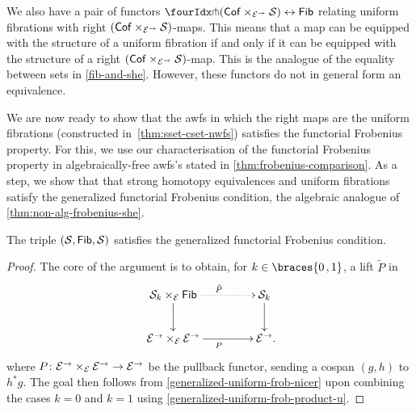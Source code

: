 \documentclass[reqno,10pt,a4paper,oneside,draft]{amsart}
\begin{document}
{{\begin{remark} \label{relating-strong-hequiv-and-uniform-fib}
We also have a pair of functors $\liftr{(\Cof \times_{\cal{E}^\to} \cal{S})} \leftrightarrow \Fib$ relating uniform fibrations with right $(\mathsf{Cof} \times_{\mathcal{E}^\to} \mathcal{S})$-maps.
This means that a map can be equipped with the structure of a uniform fibration if and only if it can be equipped with the structure of a right $(\mathsf{Cof} \times_{\mathcal{E}^\to} \mathcal{S})$-map.
This is the analogue of the equality between sets in \cref{fib-and-she}.
However, these functors do not in general form an equivalence.
\end{remark}

We are now ready to show that the awfs in which the right maps are the uniform fibrations (constructed in~\cref{thm:sset-cset-nwfs}) satisfies the functorial Frobenius property.
For this, we use our characterisation of the functorial Frobenius property in algebraically-free awfs's stated in \cref{thm:frobenius-comparison}.
As a step, we show that that strong homotopy equivalences and uniform fibrations satisfy the generalized functorial Frobenius condition, \ie the algebraic analogue of \cref{thm:non-alg-frobenius-she}.

\begin{lemma} \label{technical}
The triple $(\mathcal{S}, \mathsf{Fib}, \mathcal{S})$ satisfies the generalized functorial Frobenius condition.
\end{lemma}

\begin{proof}
The core of the argument is to obtain, for $k \in \braces{0\,, 1}$, a lift $\tilde{P}$ in
\begin{equation} \label{strong-h-equiv-uniform-base-change:goal}
\begin{gathered}
\xymatrix@C+2em{
  \cal{S}_k \times_{\cal{E}} \Fib
  \ar@{.>}[r]^{\tilde{P}}
  \ar[d]
&
  \cal{S}_k
  \ar[d]
\\
  \cal{E}^\to \times_{\cal{E}} \cal{E}^\to
  \ar[r]_{P}
&
  \cal{E}^\to
\rlap{.}}
\end{gathered}
\end{equation}
where $P \colon \mathcal{E}^\to \times_{\mathcal{E}} \mathcal{E}^\to \to \mathcal{E}^\to$ be the pullback functor, sending a cospan $(g, h)$ to $h^* g$.
The goal then follows from \cref{generalized-uniform-frob-nicer} upon combining the cases $k = 0$ and $k = 1$ using \cref{generalized-uniform-frob-product-u}.


\end{proof}}}
\end{document}
